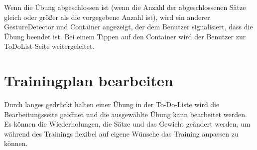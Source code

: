             Wenn die Übung abgeschlossen ist (wenn die Anzahl der abgeschlossenen Sätze gleich oder größer als die vorgegebene Anzahl ist), wird ein anderer GestureDetector und Container angezeigt, der dem Benutzer signalisiert, dass die Übung beendet ist. Bei einem Tippen auf den Container wird der Benutzer zur ToDoList-Seite weitergeleitet.
            \\

    \section{Trainingplan bearbeiten}
    \author{Antonio Kuvac}

    Durch langes gedrückt halten einer Übung in der To-Do-Liste wird die Bearbeitungsseite geöffnet und die ausgewählte Übung kann bearbeitet werden. Es können die Wiederholungen, die Sätze und das Gewicht geändert werden, um während des Trainings flexibel auf eigene Wünsche das Training anpassen zu können.

